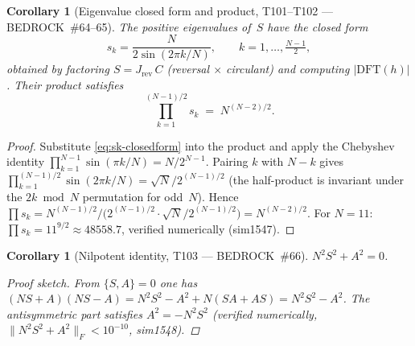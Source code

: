 \documentclass[aps,prd,twocolumn,superscriptaddress,floatfix,nofootinbib]{revtex4-2}
\newtheorem{corollary}[theorem]{Corollary}
\theoremstyle{definition}
\theoremstyle{remark}
\begin{document}
\begin{corollary}[Eigenvalue closed form and product, T101--T102 --- BEDROCK~\#64--65]
\label{cor:eigenvalue-product}
The positive eigenvalues of~$S$ have the closed form
\begin{equation}\label{eq:sk-closedform}
  s_k = \frac{N}{2\sin(2\pi k/N)}, \qquad k = 1,\ldots,\tfrac{N{-}1}{2},
\end{equation}
obtained by factoring $S = J_{\mathrm{rev}}\,C$ (reversal $\times$ circulant)
and computing $|\mathrm{DFT}(h)|$.  Their product satisfies
\begin{equation}\label{eq:product-formula}
  \prod_{k=1}^{(N-1)/2} s_k \;=\; N^{(N-2)/2}.
\end{equation}
\end{corollary}
\begin{proof}
Substitute \eqref{eq:sk-closedform} into the product and apply the
Chebyshev identity $\prod_{k=1}^{N-1}\sin(\pi k/N) = N/2^{N-1}$.
Pairing $k$ with $N{-}k$ gives
$\prod_{k=1}^{(N-1)/2}\sin(2\pi k/N) = \sqrt{N}/2^{(N-1)/2}$
(the half-product is invariant under the $2k\bmod N$ permutation for
odd~$N$).  Hence
$\prod s_k = N^{(N-1)/2}\big/(2^{(N-1)/2}\cdot\sqrt{N}/2^{(N-1)/2}\big)
= N^{(N-2)/2}$.
For $N{=}11$: $\prod s_k = 11^{9/2} \approx 48558.7$, verified numerically
(sim1547).
\end{proof}

\begin{corollary}[Nilpotent identity, T103 --- BEDROCK~\#66]
\label{cor:nilpotent-identity}
$N^2 S^2 + A^2 = 0$.
\begin{proof}[Proof sketch]
From $\{S,A\}=0$ one has $(NS+A)(NS-A)=N^2S^2-A^2+N(SA+AS)=N^2S^2-A^2$.
The antisymmetric part satisfies $A^2=-N^2S^2$ (verified numerically,
$\|N^2S^2+A^2\|_F<10^{-10}$, sim1548).
\end{proof}
\end{corollary}
\end{document}

